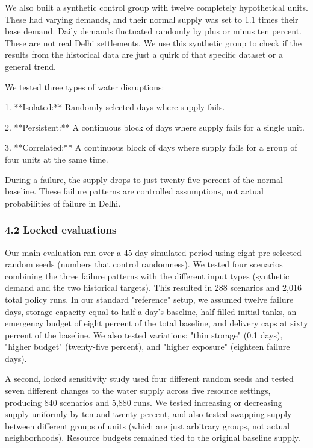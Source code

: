 \documentclass[conference]{IEEEtran}
\begin{document}
We also built a synthetic control group with twelve completely hypothetical units. These had varying demands, and their normal supply was set to 1.1 times their base demand. Daily demands fluctuated randomly by plus or minus ten percent. These are not real Delhi settlements. We use this synthetic group to check if the results from the historical data are just a quirk of that specific dataset or a general trend.

We tested three types of water disruptions:

1. **Isolated:** Randomly selected days where supply fails.

2. **Persistent:** A continuous block of days where supply fails for a single unit.

3. **Correlated:** A continuous block of days where supply fails for a group of four units at the same time.

During a failure, the supply drops to just twenty-five percent of the normal baseline. These failure patterns are controlled assumptions, not actual probabilities of failure in Delhi.

\subsubsection{4.2 Locked evaluations}
Our main evaluation ran over a 45-day simulated period using eight pre-selected random seeds (numbers that control randomness). We tested four scenarios combining the three failure patterns with the different input types (synthetic demand and the two historical targets). This resulted in 288 scenarios and 2,016 total policy runs. In our standard "reference" setup, we assumed twelve failure days, storage capacity equal to half a day's baseline, half-filled initial tanks, an emergency budget of eight percent of the total baseline, and delivery caps at sixty percent of the baseline. We also tested variations: "thin storage" (0.1 days), "higher budget" (twenty-five percent), and "higher exposure" (eighteen failure days).

A second, locked sensitivity study used four different random seeds and tested seven different changes to the water supply across five resource settings, producing 840 scenarios and 5,880 runs. We tested increasing or decreasing supply uniformly by ten and twenty percent, and also tested swapping supply between different groups of units (which are just arbitrary groups, not actual neighborhoods). Resource budgets remained tied to the original baseline supply.
\end{document}

